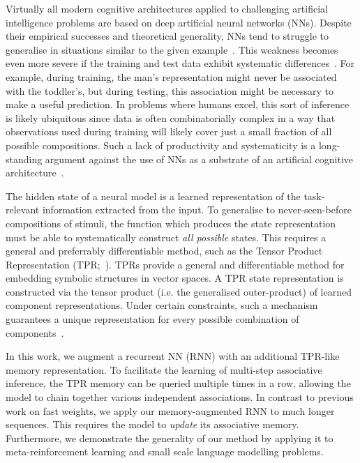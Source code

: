 \documentclass{article} \usepackage{iclr2021_conference,times}
\begin{document}
Virtually all modern cognitive architectures applied to challenging artificial intelligence problems are based on deep artificial neural networks (NNs).
Despite their empirical successes and theoretical generality, NNs tend to struggle to generalise in situations similar to the given example~\citep{lake2017building, phillips1995connectionism, still_not_systematic_lake}. 
This weakness becomes even more severe if the training and test data exhibit systematic differences~\citep{atzmon2016learning, Agrawal2017CVQAAC}. For example, during training, the man's representation might never be associated with the toddler's, but during testing, this association might be necessary to make a useful prediction. 
In problems where humans excel, this sort of inference is likely ubiquitous since data is often combinatorially complex in a way that observations used during training will likely cover just a small fraction of all possible compositions.
Such a lack of productivity and systematicity is a long-standing argument against the use of NNs as a substrate of an artificial cognitive architecture~\citep{fodor1988connectionism, hadley1994systematicity,mclaughlin2009systematicity}.

The hidden state of a neural model is a learned representation of the task-relevant information extracted from the input.
To generalise to never-seen-before compositions of stimuli, the function which produces the state representation must be able to systematically construct \textit{all possible} states.
This requires a general and preferrably differentiable method, such as the Tensor Product Representation (TPR;~\citet{Smolensky1990TPR}). 
TPRs provide a general and differentiable method for embedding symbolic structures in vector spaces.
A TPR state representation is constructed via the tensor product (i.e. the generalised outer-product) of learned component representations.
Under certain constraints, such a mechanism guarantees a unique representation for every possible combination of components~\citep{Smolensky1990TPR, smolensky2012symbolic}.

In this work, we augment a recurrent NN (RNN) with an additional TPR-like memory representation.
To facilitate the learning of multi-step associative inference, the TPR memory can be queried multiple times in a row, allowing the model to chain together various independent associations. 
In contrast to previous work on fast weights, we apply our memory-augmented RNN to much longer sequences. This requires the model to \textit{update} its associative memory. Furthermore, we demonstrate the generality of our method by applying it to meta-reinforcement learning and small scale language modelling problems. 
\end{document}

